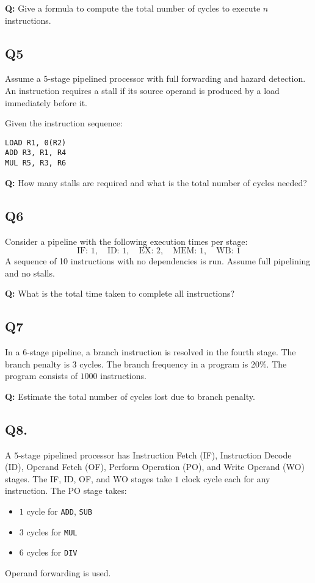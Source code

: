 \textbf{Q:} Give a formula to compute the total number of cycles to execute $n$ instructions.

\newpage
\subsection*{Q5}
Assume a $5$-stage pipelined processor with full forwarding and hazard detection. An instruction requires a stall if its source operand is produced by a load immediately before it. 

Given the instruction sequence:
\begin{verbatim}
LOAD R1, 0(R2)
ADD R3, R1, R4
MUL R5, R3, R6
\end{verbatim}
\textbf{Q:} How many stalls are required and what is the total number of cycles needed?

\subsection*{Q6}
Consider a pipeline with the following execution times per stage:
\[
\text{IF: }1, \quad \text{ID: }1, \quad \text{EX: }2, \quad \text{MEM: }1, \quad \text{WB: }1
\]
A sequence of 10 instructions with no dependencies is run. Assume full pipelining and no stalls.

\textbf{Q:} What is the total time taken to complete all instructions?

\subsection*{Q7}
In a $6$-stage pipeline, a branch instruction is resolved in the fourth stage. The branch penalty is 3 cycles. The branch frequency in a program is 20\%. The program consists of $1000$ instructions.

\textbf{Q:} Estimate the total number of cycles lost due to branch penalty.

\newpage
\subsection*{Q8.} A $5$-stage pipelined processor has Instruction Fetch (IF), Instruction Decode (ID), Operand Fetch (OF), Perform Operation (PO), and Write Operand (WO) stages. The IF, ID, OF, and WO stages take $1$ clock cycle each for any instruction. The PO stage takes:
\begin{itemize}
    \item $1$ cycle for \texttt{ADD}, \texttt{SUB}
    \item $3$ cycles for \texttt{MUL}
    \item $6$ cycles for \texttt{DIV}
\end{itemize}
Operand forwarding is used.

